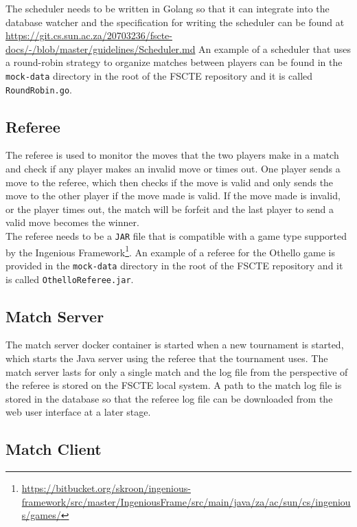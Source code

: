 \documentclass[a4paper, 12pt]{report}
\begin{document}
The scheduler needs to be written in Golang so that it can integrate into the
database watcher and the specification for writing the scheduler can be found at
\url{https://git.cs.sun.ac.za/20703236/fscte-docs/-/blob/master/guidelines/Scheduler.md}
An example of a scheduler that uses a round-robin strategy to organize matches
between players can be found in the \texttt{mock-data} directory in the root of
the FSCTE repository and it is called \texttt{RoundRobin.go}.

\subsection{Referee}
\label{sec:referee}

The referee is used to monitor the moves that the two players make in a match and
check if any player makes an invalid move or times out. One player sends a
move to the referee, which then checks if the move is valid and only sends
the move to the other player if the move made is valid. If the move made is
invalid, or the player times out, the match will be forfeit and the last player
to send a valid move becomes the winner. \\

The referee needs to be a \texttt{JAR} file that is compatible with a game type
supported by the Ingenious
Framework\footnote{\url{https://bitbucket.org/skroon/ingenious-framework/src/master/IngeniousFrame/src/main/java/za/ac/sun/cs/ingenious/games/}}.
An example of a referee for the Othello game is provided in the \texttt{mock-data}
directory in the root of the FSCTE repository and it is called \texttt{OthelloReferee.jar}.

\subsection{Match Server}

The match server docker container is started when a new tournament is started,
which starts the Java server using the referee that the tournament uses. The match
server lasts for only a single match and the log file from the perspective of the
referee is stored on the FSCTE local system. A path to the match log file is stored
in the database so that the referee log file can be downloaded from the web user
interface at a later stage.

\subsection{Match Client}
\end{document}
